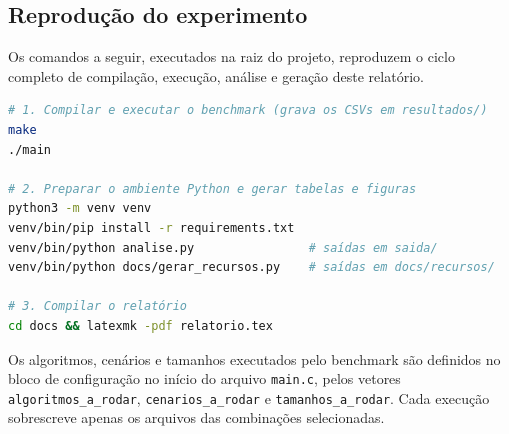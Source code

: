 \documentclass[
    12pt,
    oneside,
    a4paper,
    openany,
    chapter=TITLE,
    english,
    brazil
]{abntex2}
\newif\ifemreferencias
\begin{document}
\postextual

\emreferenciastrue

\emreferenciasfalse

\begin{apendicesenv}
\partapendices

\chapter{Reprodução do experimento}
\label{apendice:reproducao}

Os comandos a seguir, executados na raiz do projeto, reproduzem o ciclo completo de compilação, execução, análise e geração deste relatório.

\begin{lstlisting}[language=bash]
# 1. Compilar e executar o benchmark (grava os CSVs em resultados/)
make
./main

# 2. Preparar o ambiente Python e gerar tabelas e figuras
python3 -m venv venv
venv/bin/pip install -r requirements.txt
venv/bin/python analise.py                # saídas em saida/
venv/bin/python docs/gerar_recursos.py    # saídas em docs/recursos/

# 3. Compilar o relatório
cd docs && latexmk -pdf relatorio.tex
\end{lstlisting}

Os algoritmos, cenários e tamanhos executados pelo benchmark são definidos no bloco de configuração no início do arquivo \texttt{main.c}, pelos vetores \texttt{algoritmos\_a\_rodar}, \texttt{cenarios\_a\_rodar} e \texttt{tamanhos\_a\_rodar}. Cada execução sobrescreve apenas os arquivos das combinações selecionadas.

\end{apendicesenv}
\end{document}
